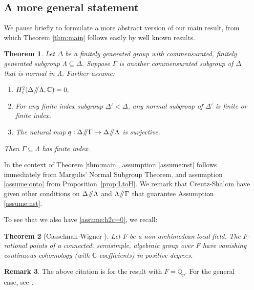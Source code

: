 \documentclass[11pt]{article}
\numberwithin{equation}{section}\providecommand{\llangle}{\langle\!\langle}\providecommand{\rrangle}{\rangle\!\rangle}\providecommand{\Asterisk}{\ast}
\newcommand{\sslash}{\mathbin{\mkern-3mu /\mkern-5mu/ \mkern-3mu}}
\newcommand{\bbC}{\ensuremath{\mathbb{C}}}
\newcommand{\bbQ}{\ensuremath{\mathbb{Q}}}
\newtheorem{thm}{Theorem}[section]
\theoremstyle{definition}
\newtheorem{rem}[thm]{Remark}
\begin{document}
\subsection{A more general statement}
\label{subsec:generalversion}

We pause briefly to formulate a more abstract version of our main result, from which Theorem \ref{thm:main} follows easily by well known results.

\begin{thm}\label{thm:gen}
Let $\Delta$ be a finitely generated group with commensurated, finitely generated subgroup $\Lambda\subseteq \Delta$. Suppose $\Gamma$ is another commensurated subgroup of $\Delta$ that is normal in $\Lambda$. Further assume:
\begin{enumerate}
\item\label{assume:h2c=0} $H^2_c(\Delta\sslash \Lambda, \bbC)=0,$ 
\item\label{assume:nst} For any finite index subgroup $\Delta'<\Delta$, any normal subgroup of $\Delta'$ is finite or finite index, 
\item\label{assume:onto}
The natural map $q: \Delta\sslash\Gamma \to \Delta\sslash\Lambda$ is surjective.
\end{enumerate}
Then $\Gamma\subseteq\Lambda$ has finite index.
\end{thm}

In the context of Theorem \ref{thm:main}, assumption \eqref{assume:nst} follows immediately from Margulis' Normal Subgroup Theorem, and assumption \eqref{assume:onto} from Proposition~\ref{prop:LtoH}. We remark that Creutz-Shalom \cite{creutz-shalom} have given other conditions on $\Delta\sslash\Lambda$ and $\Lambda\sslash\Gamma$ that guarantee Assumption \eqref{assume:nst}.

To see that we also have \eqref{assume:h2c=0}, we recall:

\begin{thm}[{Casselman-Wigner \cite[Cor.\,2]{casselman-wigner}}]
\label{CW}
Let $F$ be a non-archimedean local field. The $F$-rational points of a connected, semisimple, algebraic group over $F$ have vanishing continuous cohomology (with $\bbC$-coefficients) in positive degrees.
\end{thm}

\begin{rem}\label{rem:any-field}
The above citation is for the result with $F=\bbQ_p$. For the general case, see \cite[Rem.\,(2), p.\,210]{casselman-wigner}.
\end{rem}
\end{document}
